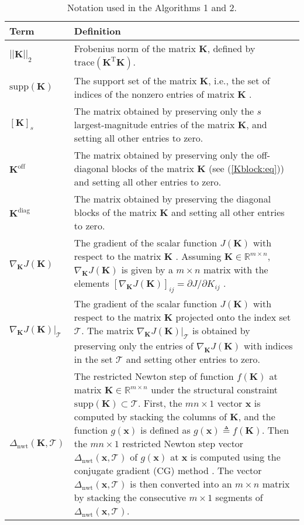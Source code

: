 \documentclass[12pt, draftclsnofoot,onecolumn]{IEEEtran}
\begin{document}
\begin{table}[!b]
\centering
\caption{Notation used in the Algorithms 1 and 2.}
\begin{tabular}{p{}p{}}
\hline
{\bf Term} & {\bf Definition}\\
\hline
$||{\boldsymbol K}||_2$ & Frobenius norm of the matrix ${\boldsymbol K}$, defined by $\mathrm{trace}({\boldsymbol K}^{\mathrm{T}}{\boldsymbol K})$. \\
\hline
$\mathrm{supp}({\boldsymbol K})$ & The support set of the matrix ${\boldsymbol K}$, i.e., the set of indices of the nonzero entries of matrix ${\boldsymbol K}$ \cite{bahmani2013greedy}.\\
\hline
$[{\boldsymbol K}]_s$ & The matrix obtained by preserving only the $s$ largest-magnitude entries of the matrix ${\boldsymbol K}$, and setting all other entries to zero. \\
\hline 
${\boldsymbol K}^{\mathrm{off}}$ & The matrix obtained by preserving only the off-diagonal blocks of the matrix ${\boldsymbol K}$ (see (\ref{Kblock:eq})) and setting all other entries to zero. \\
\hline
${\boldsymbol K}^{\mathrm{diag}}$ & The matrix obtained by preserving the diagonal blocks of the matrix ${\boldsymbol K}$ and setting all other entries to zero.\\
\hline
$\nabla_{\boldsymbol K}J({\boldsymbol K})$ & The gradient of the scalar function $J({\boldsymbol K})$ with respect to the matrix ${\boldsymbol K}$ \cite{rautert1997computational}. Assuming ${\boldsymbol K}\in \mathbb{R}^{m\times n}$, $\nabla_{\boldsymbol K}J({\boldsymbol K})$ is given by a $m\times n$ matrix with the elements $[\nabla_{\boldsymbol K}J({\boldsymbol K})]_{ij} = \partial J/ \partial K_{ij}$ .\\ 
\hline
$\nabla_{\boldsymbol K}J({\boldsymbol K})|_{\mathcal{T}}$ & The gradient of the scalar function $J({\boldsymbol K})$ with respect to the matrix ${\boldsymbol K}$ projected onto the index set $\mathcal T$. The matrix $\nabla_{\boldsymbol K}J({\boldsymbol K})|_{\mathcal{T}}$ is obtained by preserving only the entries of $\nabla_{\boldsymbol K}J({\boldsymbol K})$ with indices in the set $\mathcal T$ and setting other entries to zero. \\
\hline
$\Delta_{\mathrm{nwt}}({\boldsymbol K},\mathcal T)$ & The restricted Newton step of function $f({\boldsymbol K})$ at matrix ${\boldsymbol K}\in \mathbb{R}^{m\times n}$ under the structural constraint $\mathrm{supp}({\boldsymbol K}) \subset \mathcal{T}$. First, the $mn{\times} 1$ vector $\boldsymbol x$ is computed by stacking the columns of $\boldsymbol K$, and the function $g(\boldsymbol x)$ is defined as $g(\boldsymbol x)\triangleq f(\boldsymbol K)$. Then the $mn{\times} 1$ restricted Newton step vector $\Delta_{\mathrm{nwt}}({\boldsymbol x},\mathcal T)$ of $g(\boldsymbol x)$ at $\boldsymbol x$ \cite{bahmani2013greedy} is computed using the conjugate gradient (CG) method \cite{lin2013design}. The vector $\Delta_{\mathrm{nwt}}({\boldsymbol x},\mathcal T)$ is then converted into an $m{\times} n$ matrix by stacking the consecutive $m {\times} 1$ segments of $\Delta_{\mathrm{nwt}}({\boldsymbol x},\mathcal T)$.\\

\end{tabular}
\end{table}
\end{document}
